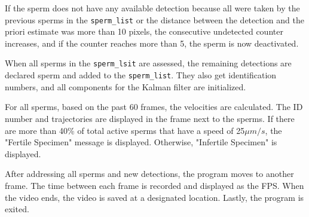 If the sperm does not have any available detection because all were taken by the previous sperms in the \verb|sperm_list| or the distance between the detection and the priori estimate was more than 10 pixels, the consecutive undetected counter increases, and if the counter reaches more than 5, the sperm is now deactivated. 

When all sperms in the \verb|sperm_lsit| are assessed, the remaining detections are declared sperm and added to the \verb|sperm_list|. They also get identification numbers, and all components for the Kalman filter are initialized.

For all sperms, based on the past 60 frames, the velocities are calculated. The ID number and trajectories are displayed in the frame next to the sperms. If there are more than 40\% of total active sperms that have a speed of 25\(\mu m/s\), the "Fertile Specimen" message is displayed. Otherwise, "Infertile Specimen" is displayed. 

After addressing all sperms and new detections, the program moves to another frame. The time between each frame is recorded and displayed as the FPS. When the video ends, the video is saved at a designated location. Lastly, the program is exited. 